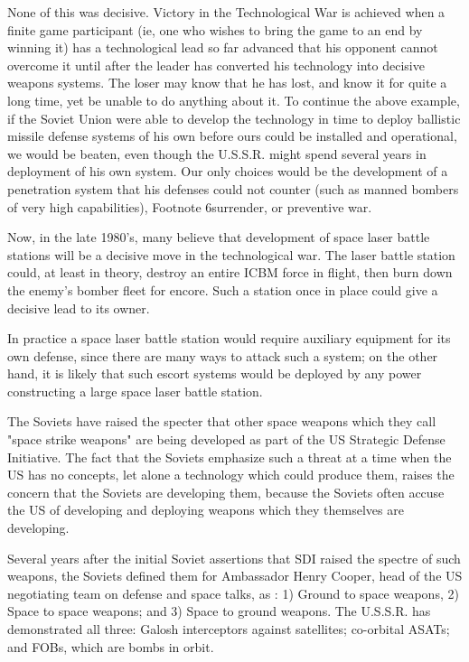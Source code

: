 \documentclass[a4paper,12pt]{book}
\begin{document}
None of this was decisive. Victory in the Technological War is achieved when a finite game participant (ie, one who wishes to bring the game to an end by winning it) has a technological lead so far advanced that his opponent cannot overcome it until after the leader has converted his technology into decisive weapons systems. The loser may know that he has lost, and know it for quite a long time, yet be unable to do anything about it. To continue the above example, if the Soviet Union were able to develop the technology in time to deploy ballistic missile defense systems of his own before ours could be installed and operational, we would be beaten, even though the U.S.S.R. might spend several years in deployment of his own system. Our only choices would be the development of a penetration system that his defenses could not counter (such as manned bombers of very high capabilities), Footnote 6surrender, or preventive war.

Now, in the late 1980's, many believe that development of space laser battle stations will be a decisive move in the technological war. The laser battle station could, at least in theory, destroy an entire ICBM force in flight, then burn down the enemy's bomber fleet for encore. Such a station once in place could give a decisive lead to its owner.

In practice a space laser battle station would require auxiliary equipment for its own defense, since there are many ways to attack such a system; on the other hand, it is likely that such escort systems would be deployed by any power constructing a large space laser battle station.

The Soviets have raised the specter that other space weapons which they call "space strike weapons" are being developed as part of the US Strategic Defense Initiative. The fact that the Soviets emphasize such a threat at a time when the US has no concepts, let alone a technology which could produce them, raises the concern that the Soviets are developing them, because the Soviets often accuse the US of developing and deploying weapons which they themselves are developing.

Several years after the initial Soviet assertions that SDI raised the spectre of such weapons, the Soviets defined them for Ambassador Henry Cooper, head of the US negotiating team on defense and space talks, as : 1) Ground to space weapons, 2) Space to space weapons; and 3) Space to ground weapons. The U.S.S.R. has demonstrated all three: Galosh interceptors against satellites; co-orbital ASATs; and FOBs, which are bombs in orbit.
\end{document}
